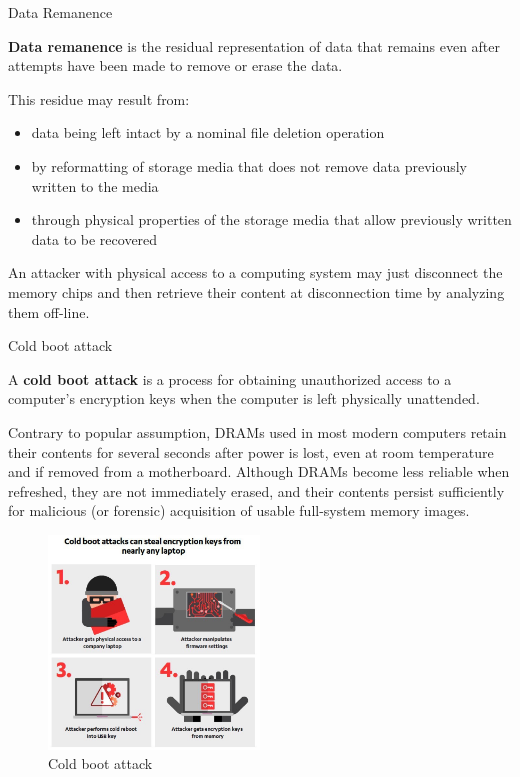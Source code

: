 \begin{section}{Data Remanence}
  \begin{boxH}
    \textbf{Data remanence} is the residual representation of data that remains even after attempts
    have been made to remove or erase the data.
  \end{boxH}
  This residue may result from:
  \begin{itemize}
    \item data being left intact by a nominal file deletion operation
    \item by reformatting of storage media that does not remove data previously written to the media
    \item through physical properties of the storage media that allow previously written data to be
      recovered
  \end{itemize}
  An attacker with physical access to a computing system may just disconnect the memory chips and
  then retrieve their content at disconnection time by analyzing them off-line.
  \begin{subsection}{Cold boot attack}
    \begin{boxH}
      A \textbf{cold boot attack} is a process for obtaining unauthorized access to a computer's
      encryption keys when the computer is left physically unattended.
    \end{boxH}
    Contrary to popular assumption, DRAMs used in most modern computers retain their contents for
    several seconds after power is lost, even at room temperature and if removed from a motherboard.
    Although DRAMs become less reliable when refreshed, they are not immediately erased, and their
    contents persist sufficiently for malicious (or forensic) acquisition of usable full-system
    memory images.

    \begin{figure}[H]
      \centering
      \includegraphics[width=0.5\textwidth]{img/hardware/cold boot attack.png}
      \caption{Cold boot attack}
      \label{fig:cold-boot-attack}
    \end{figure}
  \end{subsection}

\end{section}
